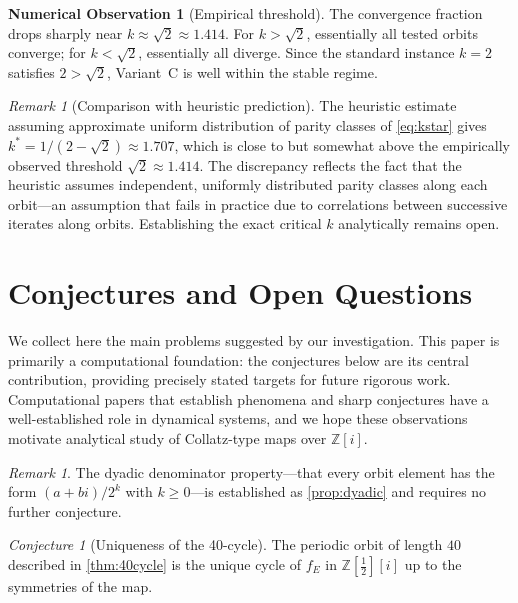 \documentclass[12pt]{article}
\theoremstyle{plain}
\theoremstyle{definition}
\theoremstyle{remark}
\newtheorem{remark}[theorem]{Remark}
\newtheorem{conjecture}[theorem]{Conjecture}
\theoremstyle{definition}
\newtheorem{numobs}[theorem]{Numerical Observation}
\newcommand{\Z}{\mathbb{Z}}
\newcommand{\Zi}{\mathbb{Z}[i]}
\begin{document}
\begin{numobs}[Empirical threshold]
\label{prop:threshold}
The convergence fraction drops sharply near $k \approx \sqrt{2}
\approx 1.414$.
For $k > \sqrt{2}$, essentially all tested orbits converge;
for $k < \sqrt{2}$, essentially all diverge.
Since the standard instance $k = 2$ satisfies $2 > \sqrt{2}$,
Variant~C is well within the stable regime.
\end{numobs}

\begin{remark}[Comparison with heuristic prediction]
The heuristic estimate assuming approximate uniform distribution of parity classes of \eqref{eq:kstar} gives
$k^* = 1/(2-\sqrt{2}) \approx 1.707$, which is close to but
somewhat above the empirically observed threshold $\sqrt{2}
\approx 1.414$.
The discrepancy reflects the fact that the heuristic assumes
independent, uniformly distributed parity classes along each
orbit---an assumption that fails in practice due to correlations
between successive iterates along orbits.
Establishing the exact critical $k$ analytically remains open.
\end{remark}

\section{Conjectures and Open Questions}
\label{sec:conjectures}

We collect here the main problems suggested by our investigation.
This paper is primarily a computational foundation: the conjectures
below are its central contribution, providing precisely stated targets
for future rigorous work. Computational papers that establish phenomena
and sharp conjectures have a well-established role in dynamical systems,
and we hope these observations motivate analytical study of
Collatz-type maps over $\Zi$.

\begin{remark}
The dyadic denominator property---that every orbit element has the
form $(a+bi)/2^k$ with $k \geq 0$---is established as
\cref{prop:dyadic} and requires no further conjecture.
\end{remark}

\begin{conjecture}[Uniqueness of the 40-cycle]
The periodic orbit of length $40$ described in \cref{thm:40cycle}
is the unique cycle of $f_E$ in $\Z[\tfrac{1}{2}][i]$ up to the
symmetries of the map.
\end{conjecture}
\end{document}
